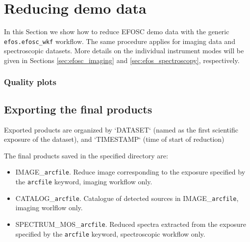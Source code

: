 
\section{Reducing demo data}
\label{sec:reducing_demo_data}

In this Section we show how to reduce EFOSC demo data with the generic
{\tt efos.efosc\_wkf} workflow. The same procedure applies for imaging
data and spectroscopic datasets. More details on the individual
instrument modes will be given in Sections \ref{sec:efosc_imaging} and
\ref{sec:efos_spectroscopy}, respectively.



 
\subsubsection{Quality plots}


\subsection{Exporting the final products}
\label{sec:export_final_products}



 
 
Exported products are organized by `DATASET` (named as the first
scientific exposure of the dataset), and `TIMESTAMP` (time of start of
reduction)

The final products saved in the specified directory are: 


\begin{itemize}
\item IMAGE\_{\tt arcfile}. Reduce image corresponding to the exposure specified by the {\tt arcfile} keyword, imaging workflow only.
\item  CATALOG\_{\tt arcfile}. Catalogue of detected sources in IMAGE\_{\tt arcfile}, imaging worlflow only.
\item SPECTRUM\_MOS\_{\tt arcfile}. Reduced spectra extracted from the exposure specified by  the {\tt arcfile} keyword, spectroscopic workflow only.
\end{itemize}

